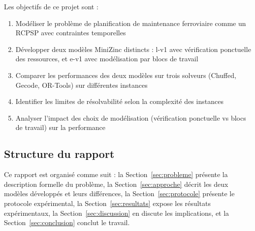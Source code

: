 Les objectifs de ce projet sont :
\begin{enumerate}
	\item Modéliser le problème de planification de maintenance ferroviaire comme un RCPSP avec contraintes temporelles
	\item Développer deux modèles MiniZinc distincts : l-v1 avec vérification ponctuelle des ressources, et e-v1 avec modélisation par blocs de travail
	\item Comparer les performances des deux modèles sur trois solveurs (Chuffed, Gecode, OR-Tools) sur différentes instances
	\item Identifier les limites de résolvabilité selon la complexité des instances
	\item Analyser l'impact des choix de modélisation (vérification ponctuelle vs blocs de travail) sur la performance
\end{enumerate}

\subsection{Structure du rapport}

Ce rapport est organisé comme suit : la Section~\ref{sec:probleme} présente la description formelle du problème, la Section~\ref{sec:approche} décrit les deux modèles développés et leurs différences, la Section~\ref{sec:protocole} présente le protocole expérimental, la Section~\ref{sec:resultats} expose les résultats expérimentaux, la Section~\ref{sec:discussion} en discute les implications, et la Section~\ref{sec:conclusion} conclut le travail.
